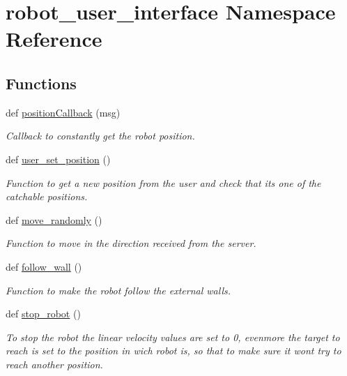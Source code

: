 \hypertarget{namespacerobot__user__interface}{}\section{robot\+\_\+user\+\_\+interface Namespace Reference}
\label{namespacerobot__user__interface}
\subsection*{Functions}
\begin{DoxyCompactItemize}
\item 
def \hyperlink{namespacerobot__user__interface_ac0334cd2b07f8bc4474062eaaceab902}{position\+Callback} (msg)
\begin{DoxyCompactList}\small\item\em Callback to constantly get the robot position. \end{DoxyCompactList}\item 
def \hyperlink{namespacerobot__user__interface_af8347c189738ddfec5e6582d1a8839fa}{user\+\_\+set\+\_\+position} ()
\begin{DoxyCompactList}\small\item\em Function to get a new position from the user and check that it\textquotesingle{}s one of the catchable positions. \end{DoxyCompactList}\item 
def \hyperlink{namespacerobot__user__interface_a137d7201aae4fbac4990876227d162f1}{move\+\_\+randomly} ()
\begin{DoxyCompactList}\small\item\em Function to move in the direction received from the server. \end{DoxyCompactList}\item 
def \hyperlink{namespacerobot__user__interface_a74312af906c16599bef2c4ade3ef87a4}{follow\+\_\+wall} ()
\begin{DoxyCompactList}\small\item\em Function to make the robot follow the external walls. \end{DoxyCompactList}\item 
def \hyperlink{namespacerobot__user__interface_a70a457867820599c4b2a30f4027dd513}{stop\+\_\+robot} ()
\begin{DoxyCompactList}\small\item\em To stop the robot the linear velocity values are set to 0, evenmore the target to reach is set to the position in wich robot is, so that to make sure it won\textquotesingle{}t try to reach another position. \end{DoxyCompactList}\item 

\end{DoxyCompactItemize}
